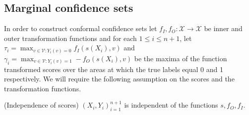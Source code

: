 \subsection{Marginal confidence sets}\label{SS:MCS}
In order to construct conformal confidence sets let $f_I, f_O:\mathcal{X} \rightarrow \mathcal{X}$ be inner and outer transformation functions and for each $1\leq i \leq n +1 $, let $\tau_i = \max_{v \in \mathcal{V}: Y_i(v) = 0} f_I(s(X_i), v)$ and $\gamma_i = \max_{v \in \mathcal{V}: Y_i(v) = 1} -f_O(s(X_i), v)$  be the maxima of the function transformed scores over the areas at which the true labels equal 0 and 1 respectively. We will require the following assumption on the scores and the transformation functions.
\begin{assumption}\label{ass:indep}
	(Independence of scores) $(X_i, Y_i)_{i = 1}^{n+1}$ is independent of the functions $s, f_O, f_I$. 
\end{assumption}

